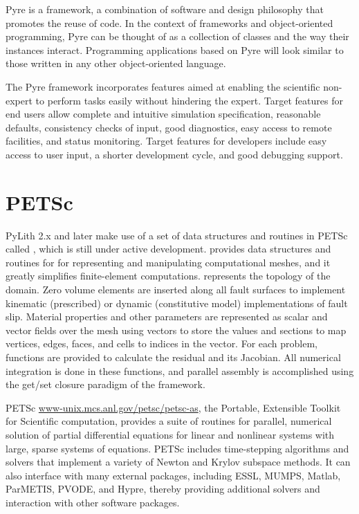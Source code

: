 Pyre is a framework, a combination of software and design philosophy
that promotes the reuse of code. In the context of frameworks and
object-oriented programming, Pyre can be thought of as a collection of
classes and the way their instances interact.  Programming
applications based on Pyre will look similar to those written in any
other object-oriented language. 

The Pyre framework incorporates features aimed at enabling the
scientific non-expert to perform tasks easily without hindering the
expert. Target features for end users allow complete and intuitive
simulation specification, reasonable defaults, consistency checks of
input, good diagnostics, easy access to remote facilities, and status
monitoring. Target features for developers include easy access to user
input, a shorter development cycle, and good debugging support.


\section{PETSc}

PyLith 2.x and later make use of a set of data structures and routines
in PETSc called , which is still under active
development.  provides data structures and routines for
for representing and manipulating computational meshes, and it greatly
simplifies finite-element computations. represents the
topology of the domain. Zero volume elements are inserted along all
fault surfaces to implement kinematic (prescribed) or dynamic
(constitutive model) implementations of fault slip. Material
properties and other parameters are represented as scalar and vector
fields over the mesh using vectors to store the values and sections to
map vertices, edges, faces, and cells to indices in the vector. For
each problem, functions are provided to calculate the residual and its
Jacobian.  All numerical integration is done in these functions, and
parallel assembly is accomplished using the get/set closure paradigm
of the  framework.

PETSc \url{www-unix.mcs.anl.gov/petsc/petsc-as}, the Portable,
Extensible Toolkit for Scientific computation, provides a suite of
routines for parallel, numerical solution of partial differential
equations for linear and nonlinear systems with large, sparse systems
of equations.  PETSc includes time-stepping algorithms and solvers
that implement a variety of Newton and Krylov subspace methods. It can
also interface with many external packages, including ESSL, MUMPS,
Matlab, ParMETIS, PVODE, and Hypre, thereby providing additional
solvers and interaction with other software packages.

